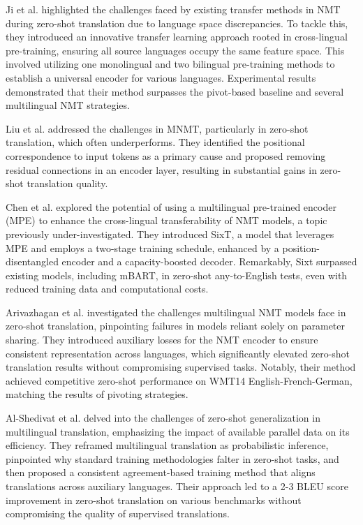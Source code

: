 \documentclass[acmsmall]{acmart}
\begin{document}
Ji et al. \cite{JiZDZCL20} highlighted the challenges faced by existing transfer methods in NMT during zero-shot translation due to language space discrepancies. To tackle this, they introduced an innovative transfer learning approach rooted in cross-lingual pre-training, ensuring all source languages occupy the same feature space. This involved utilizing one monolingual and two bilingual pre-training methods to establish a universal encoder for various languages. Experimental results demonstrated that their method surpasses the pivot-based baseline and several multilingual NMT strategies.

Liu et al. \cite{liu-etal-2021-improving-zero} addressed the challenges in MNMT, particularly in zero-shot translation, which often underperforms. They identified the positional correspondence to input tokens as a primary cause and proposed removing residual connections in an encoder layer, resulting in substantial gains in zero-shot translation quality.

Chen et al. \cite{chen-etal-2021-zero} explored the potential of using a multilingual pre-trained encoder (MPE) to enhance the cross-lingual transferability of NMT models, a topic previously under-investigated. They introduced SixT, a model that leverages MPE and employs a two-stage training schedule, enhanced by a position-disentangled encoder and a capacity-boosted decoder. Remarkably, Sixt surpassed existing models, including mBART, in zero-shot any-to-English tests, even with reduced training data and computational costs.

Arivazhagan et al. \cite{abs-1903-07091} investigated the challenges multilingual NMT models face in zero-shot translation, pinpointing failures in models reliant solely on parameter sharing. They introduced auxiliary losses for the NMT encoder to ensure consistent representation across languages, which significantly elevated zero-shot translation results without compromising supervised tasks. Notably, their method achieved competitive zero-shot performance on WMT14 English-French-German, matching the results of pivoting strategies.

Al-Shedivat et al. \cite{al-shedivat-parikh-2019-consistency} delved into the challenges of zero-shot generalization in multilingual translation, emphasizing the impact of available parallel data on its efficiency. They reframed multilingual translation as probabilistic inference, pinpointed why standard training methodologies falter in zero-shot tasks, and then proposed a consistent agreement-based training method that aligns translations across auxiliary languages. Their approach led to a 2-3 BLEU score improvement in zero-shot translation on various benchmarks without compromising the quality of supervised translations.
\end{document}
